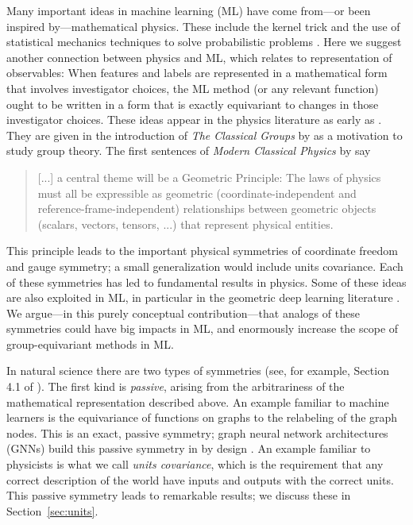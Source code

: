 \documentclass{article}
\theoremstyle{plain}
\theoremstyle{definition}
\theoremstyle{remark}
\newcommand{\sectionname}{Section}
\newcommand{\secref}[1]{\sectionname~\ref{#1}}
\begin{document}
Many important ideas in machine learning (ML) have come from---or been inspired by---mathematical physics.
These include the kernel trick \cite{CouHil53,SchSmo02} and the use of statistical mechanics techniques to solve probabilistic problems \cite{mcmc, gibbs}.
Here we suggest another connection between physics and ML, which relates to representation of observables:
When features and labels are represented in a mathematical form that involves investigator choices, the ML method (or any relevant function) ought to be written in a form that is exactly equivariant to changes in those investigator choices.
These ideas appear in the physics literature as early as \citet{gr}. They are given in the introduction of \textit{The Classical Groups} by \citet{weyl} as a motivation to study group theory.
The first sentences of \textit{Modern Classical Physics} by \citet{mcp} say
\vspace{-1.5ex}\begin{quote}
[...] a central theme will be a Geometric Principle: 
The laws of physics must all
be expressible as geometric (coordinate-independent and reference-frame-independent)
relationships between geometric objects (scalars, vectors, tensors, ...) that represent
physical entities.
\end{quote}\vspace{-1.5ex}
This principle leads to the important physical symmetries of coordinate freedom and gauge symmetry; a small generalization would include units covariance.
Each of these symmetries has led to fundamental results in physics. Some of these ideas are also exploited in ML, in particular in the geometric deep learning literature \cite{bronstein2021geometric, weiler}. 
We argue---in this purely conceptual contribution---that analogs of these symmetries could have big impacts in ML, and enormously increase the scope of group-equivariant methods in ML.

In natural science there are two types of symmetries (see, for example, Section 4.1 of \citealt{rovelli2000loop}). 
The first kind is \emph{passive}, arising from the arbitrariness of the mathematical representation described above.
An example familiar to machine learners is the equivariance of functions on graphs to the relabeling of the graph nodes.
This is an exact, passive symmetry; graph neural network architectures (GNNs) build this passive symmetry in by design \cite{bruna2013spectral, duvenaud2015convolutional, gilmer2017neural}. 
An example familiar to physicists is what we call \emph{units covariance}, which is the requirement that any correct description of the world have inputs and outputs with the correct units.
This passive symmetry leads to remarkable results; we discuss these in \secref{sec:units}.
\end{document}
